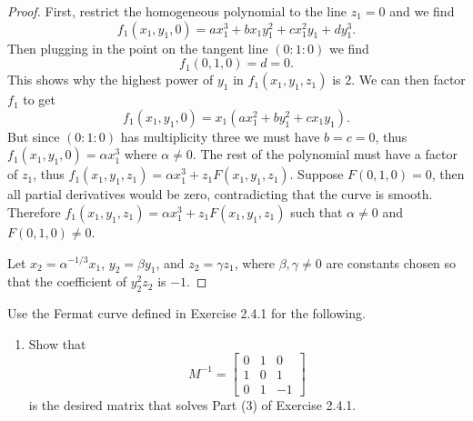 \begin{proof}
    First, restrict the homogeneous polynomial to the line $z_1 = 0$ and we find 
    \[
    f_1(x_1, y_1, 0) = a x_1^3 + b x_1 y_1^2 + c x_1^2 y_1 + d y_1^3.
    \]
    Then plugging in the point on the tangent line $(0 : 1 : 0)$ we find 
    \[
    f_1(0, 1, 0) = d = 0.
    \]
    This shows why the highest power of $y_1$ in $f_1(x_1, y_1, z_1)$ is 2.
    We can then factor $f_1$ to get 
    \[
    f_1(x_1, y_1, 0) = x_1(a x_1^2 + b y_1^2 + c x_1 y_1).
    \]
    But since $(0 : 1 : 0)$ has multiplicity three we must have $b = c = 0$,
    thus $f_1(x_1, y_1, 0) = \alpha x_1^3$ where $\alpha \ne 0$.
    The rest of the polynomial must have a factor of $z_1$,
    thus $f_1(x_1, y_1, z_1) = \alpha x_1^3 + z_1 F(x_1, y_1, z_1)$.
    Suppose $F(0, 1, 0) = 0$, then all partial derivatives would be zero,
    contradicting that the curve is smooth.
    Therefore $f_1(x_1, y_1, z_1) = \alpha x_1^3 + z_1 F(x_1, y_1, z_1)$
    such that $\alpha \ne 0$ and $F(0, 1, 0) \ne 0$.

    Let $x_2 = \alpha^{-1/3} x_1$, $y_2 = \beta y_1$, and $z_2 = \gamma z_1$,
    where $\beta, \gamma \ne 0$ are constants chosen so that the coefficient
    of $y_2^2 z_2$ is $-1$.
\end{proof}

\begin{tcolorbox}[title=Problem 3, breakable]
    Use the Fermat curve defined in Exercise 2.4.1 for 
    the following.
    \begin{enumerate}
        \item Show that 
        \[
        M^{-1} = 
        \begin{bmatrix}
            0 & 1 & 0 \\
            1 & 0 & 1 \\
            0 & 1 & -1 
        \end{bmatrix}
        \]
        is the desired matrix that solves Part (3) of Exercise 2.4.1.
    \end{enumerate}
\end{tcolorbox}

\begin{tcolorbox}[title=Problem 4, breakable]
\end{tcolorbox}

\begin{tcolorbox}[title=Problem 5, breakable]
\end{tcolorbox}

\begin{tcolorbox}[title=Problem 6, breakable]
\end{tcolorbox}

